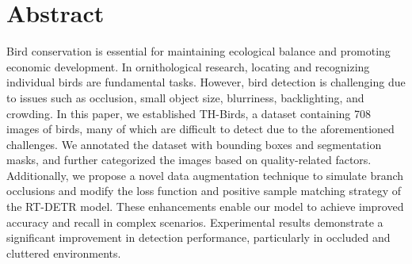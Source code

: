 \section{Abstract}
Bird conservation is essential for maintaining ecological balance and promoting economic development. 
In ornithological research, locating and recognizing individual birds are fundamental tasks. 
However, bird detection is challenging due to issues such as occlusion, small object size, blurriness, backlighting, and crowding. 
In this paper, we established TH-Birds, a dataset containing 708 images of birds, many of which are difficult to detect due to the aforementioned challenges. 
We annotated the dataset with bounding boxes and segmentation masks, and further categorized the images based on quality-related factors. 
Additionally, we propose a novel data augmentation technique to simulate branch occlusions and modify the loss function and positive sample matching strategy of the RT-DETR model. 
These enhancements enable our model to achieve improved accuracy and recall in complex scenarios. 
Experimental results demonstrate a significant improvement in detection performance, particularly in occluded and cluttered environments.


